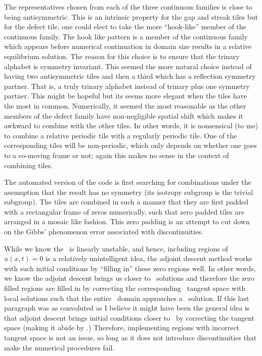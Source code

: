 \begin{description}
{\begin{description}
The representatives chosen from each of the three
continuous families is close to being antisymmetric.
This is an intrinsic property for the gap and streak
tiles but for the defect tile, one could elect
to take the more ``hook-like'' member of the continuous
family. The hook like pattern is a member of the continuous
family which appears before numerical continuation in domain
size results in a relative equilibrium solution. The
reason for this choice is to ensure that the trinary
alphabet is symmetry invariant. This seemed the
more natural choice instead of having two
antisymmetric tiles and then a third which
has a reflection symmetry partner. That is,
a truly trinary alphabet instead of trinary plus
one symmetry partner. This might be hopeful
but its seems more elegant when the
tiles have the most in common. Numerically,
it seemed the most reasonable as the
other members of the defect family
have non-negligible spatial shift which
makes it awkward to combine with the other
tiles. In other words, it is nonsensical (to me)
to combine a relative periodic tile with a
regularly periodic tile. One of the corresponding
tiles will be non-periodic, which only depends on
whether one goes to a co-moving frame or not; again
this makes no sense in the context of combining tiles.

The automated version of the code is first searching for
combinations under the assumption that the result has no
symmetry (\ie its isotropy subgroup is the trivial subgroup).
The tiles are combined in such a manner that they are first padded
with a rectangular frame of zeros numerically, such that
zero padded tiles are arranged in a mosaic like fashion. This zero
padding is an attempt to cut down on the Gibbs' phenomenon error
associated with discontinuities.

While we know the \KSe\ is linearly unstable, and hence, including
regions of $u(x,t)=0$ is a relatively unintelligent idea, the adjoint
descent method works with such initial conditions by ``filling in''
these zero regions well. In other words, we know the adjoint descent
brings us closer to \twot\ solutions and therefore the zero
filled regions are filled in by correcting the corresponding \spt\
tangent space with local solutions such that the entire \spt\ domain
approaches a \twot\ solution. If this last paragraph was as
convoluted as I believe it might have been the general idea is
that adjoint descent brings initial conditions closer
to \twots\ by correcting the tangent space (making it abide by \KSe.)
Therefore, implementing regions with incorrect tangent space is
not an issue, so long as it does not introduce discontinuities that
make the numerical procedures fail.


\end{description}}
\end{description}
